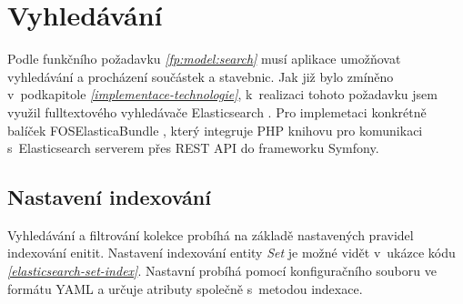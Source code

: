 \section{Vyhledávání}
Podle funkčního požadavku \emph{\ref{fp:model:search}} musí aplikace umožňovat vyhledávání a procházení součástek a stavebnic. Jak již bylo zmíněno v~podkapitole \emph{\ref{implementace-technologie}}, k~realizaci tohoto požadavku jsem využil fulltextového vyhledávače Elasticsearch \autocite{elasticsearch}. Pro implemetaci konkrétně balíček FOSElasticaBundle \autocite{foselastica}, který integruje PHP knihovu pro komunikaci s~Elasticsearch serverem přes \gls{REST} API do frameworku Symfony.


\subsection{Nastavení indexování}
Vyhledávání a filtrování kolekce probíhá na základě nastavených pravidel indexování enitit. Nastavení indexování entity \textit{Set} je 
možné vidět v~ukázce kódu \emph{\ref{elasticsearch-set-index}}. Nastavní probíhá pomocí konfiguračního souboru ve formátu \gls{YAML} a určuje atributy společně s~metodou indexace.

